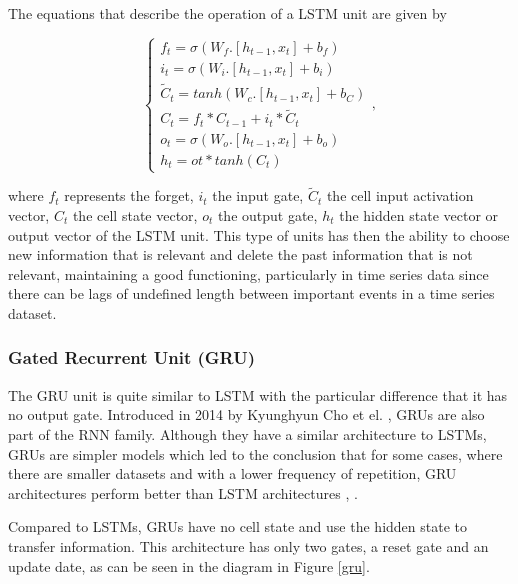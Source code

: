  


The equations that describe the operation of a \ac{LSTM} unit are given by 

\begin{equation}
    \begin{cases} 
        
        f_t=\sigma(W_f.[h_{t-1},x_t] + b_f)\\
        i_t=\sigma(W_i.[h_{t-1},x_t] + b_i)\\
        \widetilde{C}_t = tanh(W_c.[h_{t-1},x_t] + b_C)\\
        C_t=f_t*C_{t-1}+i_t* \widetilde{C}_t\\
        o_t=\sigma(W_o.[h_{t-1},x_t] + b_o)\\
        h_t=ot*tanh(C_t)
        
         
    \end{cases} ,
\end{equation}

where $f_t$ represents the forget, $i_t$ the input gate, $\widetilde{C}_t$ the cell input activation vector, ${C}_t$ the cell state vector, $o_t$ the output gate, $h_t$ the hidden state vector or output vector of the \ac{LSTM} unit. This type of units has then the ability to choose new information that is relevant and delete the past information that is not relevant, maintaining a good functioning, particularly in time series data since there can be lags of undefined length between important events in a time series dataset.

\subsubsection{Gated Recurrent Unit (GRU)}\label{chap3:subsubsec:gru}

The \ac{GRU} unit is quite similar to \ac{LSTM} with the particular difference that it has no output gate. Introduced in 2014 by Kyunghyun Cho et el. \cite{gru0}, \ac{GRU}s are also part of the \ac{RNN} family. Although they have a similar architecture to \ac{LSTM}s, \ac{GRU}s are simpler models which led to the conclusion that for some cases, where there are smaller datasets and with a lower frequency of repetition, \ac{GRU} architectures perform better than \ac{LSTM} architectures \cite{gru1}, \cite{gru2}.

Compared to \ac{LSTM}s, \ac{GRU}s have no cell state and use the hidden state to transfer information. This architecture has only two gates, a reset gate and an update date, as can be seen in the diagram in Figure \ref{gru}.


